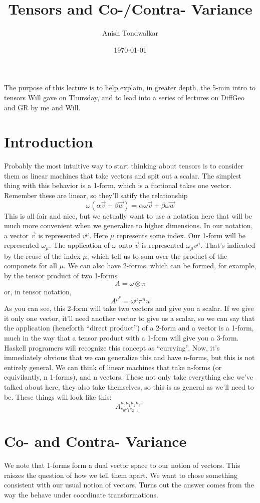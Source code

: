 \documentclass[11pt,notitlepage]{article}
\title{Tensors and Co-/Contra- Variance}
\author{Anish Tondwalkar}
\date{\today}
\begin{document}
\maketitle
The purpose of this lecture is to help explain, in greater depth, the 5-min intro to tensors Will gave on Thursday, and to lead into a series of lectures on DiffGeo and GR by me and Will.
\section{Introduction}
Probably the most intuitive way to start thinking about tensors is to consider them as linear machines that take vectors and spit out a scalar. The simplest thing with this behavior is a 1-form, which is a fuctional takes one vector. Remember these are linear, so they'll satify the relationship 
$$ \omega \left( \alpha \vec v + \beta \vec w \right) = 
 \alpha \omega \vec v + \beta \omega \vec w $$
This is all fair and nice, but we actually want to use a notation here that will be much more convenient when we generalize to higher dimensions. In our notation, a vector $\vec v$ is represented $v^\mu$. Here $\mu$ represents some index.
Our 1-form will be represented $\omega_\mu$. The application of $\omega$ onto $\vec v$ is represented $ \omega_\mu v^\mu$. That's indicated by the reuse of the index $\mu$, which tell us to sum over the product of the componets for all $\mu$. 
We can also have 2-forms, which can be formed, for example, by the tensor product of two 1-forms
$$ A = \omega \otimes \pi $$
or, in tensor notation,
$$ A^\mu^\nu = \omega^\mu \pi^nu $$
As you can see, this 2-form will take two vectors and give you a scalar. If we give it only one vector, it'll need another vector to give us a scalar, so we can say that the application (heneforth ``direct product'') of a 2-form and a vector is a 1-form, much in the way that a tensor  product with a 1-form will give you a 3-form. Haskell programers will recognize this concept as ``currying''.
Now, it's immediately obvious that we can generalize this and have n-forms, but this is not entirely general. We can think of linear machines that take n-forms (or equivilantly, n 1-forms), and n vectors. These not only take everything else we've talked about here, they also take themselves, so this is as general as we'll need to be. These things will look like this: 
$$ A^{\mu_0 \mu_1 \mu_2 \mu_3 \ldots}_{\nu_0 \nu_1 \nu_2 \ldots} $$
\section{Co- and Contra- Variance}
We note that 1-forms form a dual vector space to our notion of vectors. This raiszes the question of how we tell them apart. We want to chose something consistent with our usual notion of vectors. Turns out the answer comes from the way the behave under coordinate transformations.  
\end{document}

